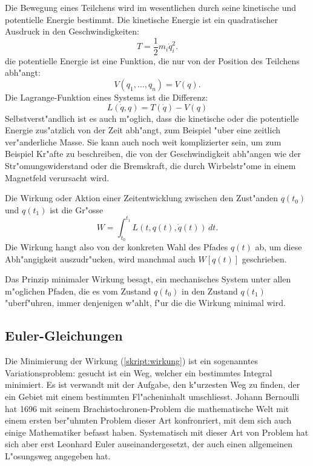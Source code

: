 Die Bewegung eines Teilchens wird im wesentlichen durch seine 
kinetische und potentielle Energie bestimmt. Die kinetische Energie
ist ein quadratischer Ausdruck in den Geschwindigkeiten:
\[
T=\frac12m_i\dot q_i^2.
\]
die potentielle Energie ist eine Funktion, die nur von der
Position des Teilchens abh"angt:
\[
V(q_1,\dots,q_n)=V(q).
\]
Die Lagrange-Funktion eines Systems ist die Differenz:
\[
L(\dot q, q) = T(\dot q) - V(q)
\]
Selbstverst"andlich ist es auch m"oglich, dass die kinetische oder
die potentielle Energie
zus"atzlich von der Zeit abh"angt, zum Beispiel "uber eine
zeitlich ver"anderliche Masse.
Sie kann auch noch weit komplizierter sein, um zum Beispiel Kr"afte
zu beschreiben, die von der Geschwindigkeit abh"angen wie der
Str"omungswiderstand oder die Bremskraft, die durch Wirbelstr"ome in
einem Magnetfeld verursacht wird.

Die Wirkung oder Aktion einer Zeitentwicklung zwischen den Zust"anden
$q(t_0)$ und $q(t_1)$ ist die Gr"osse
\begin{equation}
W=\int_{t_0}^{t_1} L(t, q(t), \dot q(t))\,dt.
\label{skript:wirkung}
\end{equation}
Die Wirkung hangt also von der konkreten Wahl des Pfades $q(t)$ ab,
um diese Abh"angigkeit auszudr"ucken, wird manchmal auch $W[q(t)]$
geschrieben.

Das Prinzip minimaler Wirkung besagt, ein mechanisches System unter
allen m"oglichen Pfaden, die es vom Zustand $q(t_0)$ in den Zustand
$q(t_1)$ "uberf"uhren, immer denjenigen w"ahlt, f"ur die die
Wirkung minimal wird.

\subsection{Euler-Gleichungen}
Die Minimierung der Wirkung (\ref{skript:wirkung}) ist ein sogenanntes
Variationsproblem: gesucht ist ein Weg, welcher ein bestimmtes
Integral minimiert. Es ist verwandt mit der Aufgabe, den k"urzesten
Weg zu finden, der ein Gebiet mit einem bestimmten Fl"acheninhalt
umschliesst. Johann Bernoulli hat 1696 mit seinem Brachistochronen-Problem
die mathematische Welt mit einem ersten ber"uhmten Problem dieser Art
konfronriert, mit dem sich auch einige Mathematiker befasst haben.
Systematisch mit dieser Art von Problem hat sich aber erst Leonhard
Euler auseinandergesetzt, der auch einen allgemeinen L"osungsweg angegeben hat.

